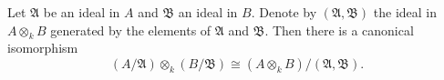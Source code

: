 Let $\mathfrak{A}$ be an ideal in $A$ and $\mathfrak{B}$ an ideal in $B$. Denote by $(\mathfrak{A}, \mathfrak{B})$ the ideal in $A \otimes_k B$ generated by the elements of $\mathfrak{A}$ and $\mathfrak{B}$. Then there is a canonical isomorphism
$$(A/\mathfrak{A}) \otimes_k (B/\mathfrak{B}) \cong (A \otimes_k B) / (\mathfrak{A}, \mathfrak{B}).$$
